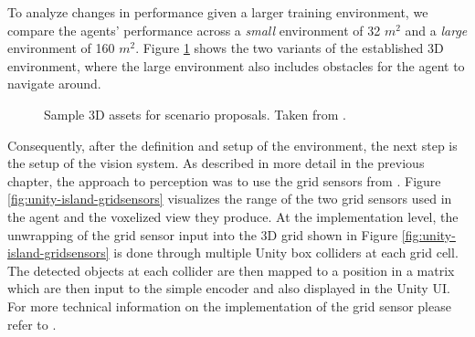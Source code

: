 To analyze changes in performance given a larger training environment, we compare the agents' performance across a \textit{small} environment of 32 $m^2$ and a \textit{large} environment of 160 $m^2$. Figure \ref{fig:unity-islands-bigsmall} shows the two variants of the established 3D environment, where the large environment also includes obstacles for the agent to navigate around.


\begin{figure}[!ht]
    \centering
    \caption{Sample 3D assets for scenario proposals. Taken from \cite{unity-asset-store}.}
    \label{fig:unity-islands-bigsmall}
\end{figure}

Consequently, after the definition and setup of the environment, the next step is the setup of the vision system. As described in more detail in the previous chapter, the approach to perception was to use the grid sensors from \cite{github-unity-mlagents-toolkit, github-mbaske-gridsensor}. 
Figure \ref{fig:unity-island-gridsensors} visualizes the range of the two grid sensors used in the agent and the voxelized view they produce. 
At the implementation level, the unwrapping of the grid sensor input into the 3D grid shown in Figure \ref{fig:unity-island-gridsensors} is done through multiple Unity box colliders at each grid cell. 
The detected objects at each collider are then mapped to a position in a matrix which are then input to the simple encoder and also displayed in the Unity UI. For more technical information on the implementation of the grid sensor please refer to \cite{github-mbaske-gridsensor}.


